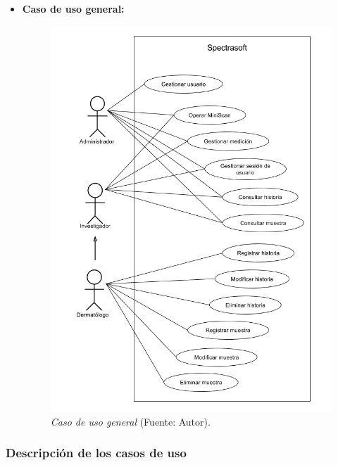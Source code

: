 \begin{itemize}
		\item \textbf{Caso de uso general:}
 	
 		\begin{figure}[H]
		\centering
		\includegraphics[scale=0.6]{img/cu-general.png}
			\caption[Caso de uso general]{\textit{Caso de uso general} (Fuente: Autor).}
		\end{figure}
	
 \end{itemize}
 
\newpage
 
	\subsubsection{Descripci\'{o}n de los casos de uso}
	
